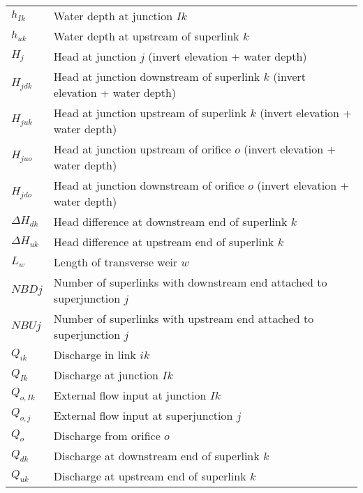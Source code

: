 \documentclass[11pt]{article}
\begin{document}
\begin{table}[!htb]
\begin{tabular}{l | l}
    $h_{Ik}$ & Water depth at junction $Ik$ \\ 
    $h_{uk}$ & Water depth at upstream of superlink $k$ \\
    $H_j$ & Head at junction $j$ (invert elevation + water depth)\\
    $H_{jdk}$ & Head at junction downstream of superlink $k$ (invert elevation + water depth) \\
    $H_{juk}$ & Head at junction upstream of superlink $k$ (invert elevation + water depth) \\
    $H_{juo}$ & Head at junction upstream of orifice $o$ (invert elevation + water depth) \\
    $H_{jdo}$ & Head at junction downstream of orifice $o$ (invert elevation + water depth) \\
    $\Delta H_{dk}$ & Head difference at downstream end of superlink $k$ \\
    $\Delta H_{uk}$ & Head difference at upstream end of superlink $k$ \\
    $L_w$ & Length of transverse weir $w$ \\
    $NBDj$ & Number of superlinks with downstream end attached to superjunction $j$ \\
    $NBUj$ & Number of superlinks with upstream end attached to superjunction $j$ \\
    $Q_{ik}$ & Discharge in link $ik$ \\
    $Q_{Ik}$ & Discharge at junction $Ik$ \\
    $Q_{o,Ik}$ & External flow input at junction $Ik$ \\
    $Q_{o,j}$ & External flow input at superjunction $j$ \\
    $Q_o$ & Discharge from orifice $o$ \\
    $Q_{dk}$ & Discharge at downstream end of superlink $k$ \\
    $Q_{uk}$ & Discharge at upstream end of superlink $k$ \\
    \hline
  \end{tabular}
\end{table}

\clearpage
\end{document}
